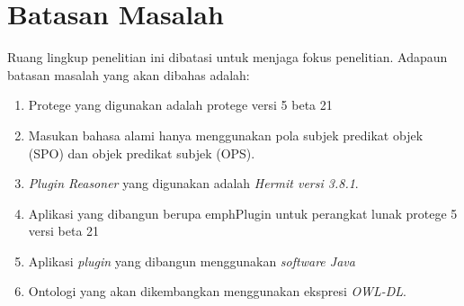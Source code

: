 \section{Batasan Masalah}
Ruang lingkup penelitian ini dibatasi untuk menjaga fokus penelitian. Adapaun batasan masalah yang akan dibahas adalah:
\begin{enumerate}
	\item Protege yang digunakan adalah protege versi 5 beta 21
	\item Masukan bahasa alami hanya menggunakan pola subjek predikat objek (SPO) dan objek predikat subjek (OPS).
	\item \emph{Plugin Reasoner} yang digunakan adalah \emph{Hermit versi 3.8.1}.
	\item Aplikasi yang dibangun berupa emph{Plugin} untuk perangkat lunak protege 5 versi beta 21
	\item Aplikasi \emph{plugin} yang dibangun menggunakan \emph{software Java} 
	\item Ontologi yang akan dikembangkan menggunakan ekspresi \emph{OWL-DL}.
\end{enumerate}
